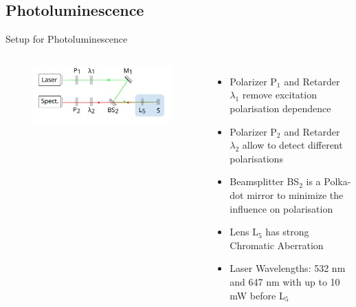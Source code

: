 \documentclass[
	10pt,
]{beamer}
\begin{document}
\subsection{Photoluminescence}
\begin{frame}{Setup for Photoluminescence}
	\begin{columns}
		\begin{figure}
			\centering
			\includegraphics[width=\textwidth]{../figures/setup_simplified.pdf}
		\end{figure}
		
		\begin{itemize}
			\item Polarizer {\color{seeblau}P$_1$} and Retarder {\color{seeblau}$\lambda_1$} remove excitation polarisation dependence
			\item Polarizer {\color{seeblau}P$_2$} and Retarder {\color{seeblau}$\lambda_2$} allow to detect different polarisations 
			\item Beamsplitter {\color{seeblau}BS$_2$} is a Polka-dot mirror to minimize the influence on polarisation
			\item Lens {\color{seeblau}L$_5$} has strong Chromatic Aberration
			\item Laser Wavelengths: 532 nm and 647 nm with up to 10 mW before L$_5$
		\end{itemize}
	\end{columns}
\end{frame}
\end{document}
